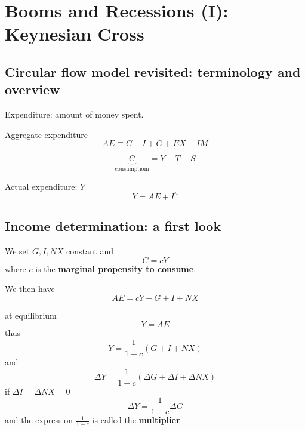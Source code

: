 \documentclass[a4paper] {scrartcl}
\begin{document}
\section{Booms and Recessions (I): Keynesian Cross} %
\label{sec:booms_and_recessions_i_keynesian_cross}

\subsection{Circular flow model revisited: terminology and overview} %
\label{sub:circular_flow_model_revisited_terminology_and_overview}


Expenditure: amount of money spent.

Aggregate expenditure
\begin{equation}
	AE \equiv C+ I + G + EX -IM
\end{equation}

\begin{equation}
	\underbrace{C}_{\text{consumptiom}} = Y - T - S
\end{equation}

Actual expenditure: $Y$
\begin{equation}
	Y = AE + I^u
\end{equation}

\subsection{Income determination: a first look} %
\label{sub:income_determination_a_first_look}
We set $G, I, NX$ constant and 
\begin{equation}
	C = cY
\end{equation}
where $c$ is the \textbf{marginal propensity to consume}.

We then have
\begin{equation}
	AE = cY + G + I + NX 
\end{equation}

at equilibrium
\begin{equation}
	Y = AE
\end{equation}
thus
\begin{equation}
	Y = \frac{1}{1-c}(G + I + NX)
\end{equation}
and 
\begin{equation}
	\Delta Y = \frac{1}{1-c}(\Delta G + \Delta I + \Delta NX)
\end{equation}
if $\Delta I = \Delta NX = 0$
\begin{equation}
	\Delta Y = \frac{1}{1-c}\Delta G
\end{equation}
and the expression $\frac{1}{1-c}$ is called the \textbf{ multiplier}
\end{document}

